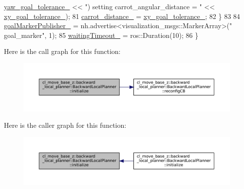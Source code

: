 \begin{DoxyCode}
      \hyperlink{classcl__move__base__z_1_1backward__local__planner_1_1BackwardLocalPlanner_a9c5104d328041fcde5a3c02664abad48}{yaw\_goal\_tolerance\_} << \textcolor{stringliteral}{") setting carrot\_angular\_distance = "} << 
      \hyperlink{classcl__move__base__z_1_1backward__local__planner_1_1BackwardLocalPlanner_aa4ec2c87947a3c08f8278eff052e7c8c}{xy\_goal\_tolerance\_});
81                 \hyperlink{classcl__move__base__z_1_1backward__local__planner_1_1BackwardLocalPlanner_a0bbb80ce5bae865c4322869422803296}{carrot\_distance\_} = \hyperlink{classcl__move__base__z_1_1backward__local__planner_1_1BackwardLocalPlanner_aa4ec2c87947a3c08f8278eff052e7c8c}{xy\_goal\_tolerance\_};
82             \}
83 
84             \hyperlink{classcl__move__base__z_1_1backward__local__planner_1_1BackwardLocalPlanner_a79f0ddfa686e2cd47bbc2f0bac9f3d4c}{goalMarkerPublisher\_} = nh.advertise<visualization\_msgs::MarkerArray>(\textcolor{stringliteral}{"
      goal\_marker"}, 1);
85             \hyperlink{classcl__move__base__z_1_1backward__local__planner_1_1BackwardLocalPlanner_a0c15da985f7f051164adb643c03a0c90}{waitingTimeout\_} = ros::Duration(10);
86         \}
\end{DoxyCode}
Here is the call graph for this function\+:
\nopagebreak
\begin{figure}[H]
\begin{center}
\leavevmode
\includegraphics[width=350pt]{classcl__move__base__z_1_1backward__local__planner_1_1BackwardLocalPlanner_a5c9815019cef272faed835cd8c575196_cgraph}
\end{center}
\end{figure}
Here is the caller graph for this function\+:
\nopagebreak
\begin{figure}[H]
\begin{center}
\leavevmode
\includegraphics[width=350pt]{classcl__move__base__z_1_1backward__local__planner_1_1BackwardLocalPlanner_a5c9815019cef272faed835cd8c575196_icgraph}
\end{center}
\end{figure}
